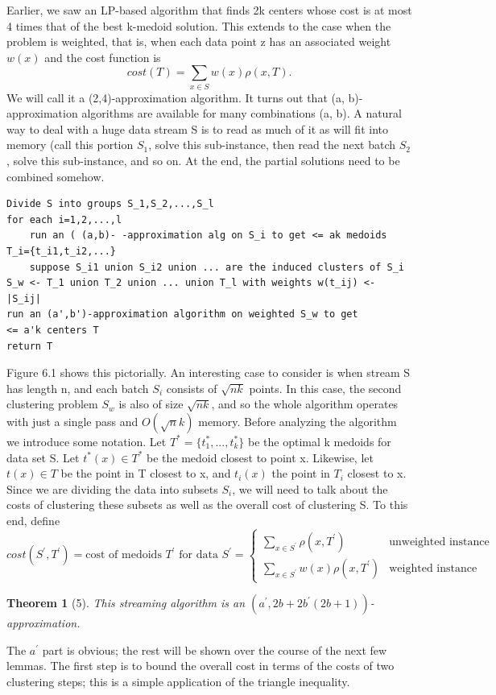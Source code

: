 \documentclass[letterpaper,10pt]{article}
\theoremstyle{plain}
\newtheorem{theorem}{Theorem}
\begin{document}
Earlier, we saw an LP-based algorithm that finds 2k centers whose cost is at most 4 times that of the best k-medoid solution.  This extends to the case when the problem is weighted, that is, when each data point z has an associated weight $w(x)$ and the cost function is 
\[
cost(T)=\sum_{x\in S}w(x)\rho(x,T).
\]
We will call it a (2,4)-approximation algorithm.  It turns out that (a, b)-approximation algorithms are available for many combinations (a, b).  A natural way to deal with a huge data stream S is to read as much of it as will fit into memory (call this portion $S_{1}$, solve this sub-instance, then read the next batch $S_{2}$, solve this sub-instance, and so on.  At the end, the partial solutions need to be combined somehow. 
\begin{verbatim}
Divide S into groups S_1,S_2,...,S_l
for each i=1,2,...,l
    run an ( (a,b)- -approximation alg on S_i to get <= ak medoids T_i={t_i1,t_i2,...}
    suppose S_i1 union S_i2 union ... are the induced clusters of S_i
S_w <- T_1 union T_2 union ... union T_l with weights w(t_ij) <- |S_ij|
run an (a',b')-approximation algorithm on weighted S_w to get
<= a'k centers T
return T
\end{verbatim}
Figure 6.1 shows this pictorially.  An interesting case to consider is when stream S has length n, and each batch $S_{i}$ consists of $\sqrt{nk}$ points.  In this case, the second clustering problem $S_{w}$ is also of size $\sqrt{nk}$, and so the whole algorithm operates with just a single pass and $O(\sqrt{n}k)$ memory.  Before analyzing the algorithm we introduce some notation.  Let $T^{*}=\{t_{1}^{*},...,t_{k}^{*}\}$ be the optimal k medoids for data set S.  Let $t^{*}(x)\in T^{*}$ be the medoid closest to point x.  Likewise, let $t(x)\in T$ be the point in T closest to x, and $t_{i}(x)$ the point in $T_{i}$ closest to x.  Since we are dividing the data into subsets $S_{i}$, we will need to talk about the costs of clustering these subsets as well as the overall cost of clustering S.  To this end, define 
\[
cost(S^{\prime},T^{\prime})= \text{cost of medoids } T^{\prime} \text{ for data } S^{\prime} =
\begin{cases}
    \sum_{x\in S^{\prime}}\rho(x,T^{\prime}) & \text{unweighted instance} \\
    \sum_{x\in S^{\prime}}w(x)\rho(x,T^{\prime}) & \text{weighted instance}
\end{cases}
\]
\begin{theorem}[5]
This streaming algorithm is an $(a^{\prime},2b+2b^{\prime}(2b+1))$-approximation. 
\end{theorem}
The $a^{\prime}$ part is obvious; the rest will be shown over the course of the next few lemmas.  The first step is to bound the overall cost in terms of the costs of two clustering steps;  this is a simple application of the triangle inequality. 
\end{document}
